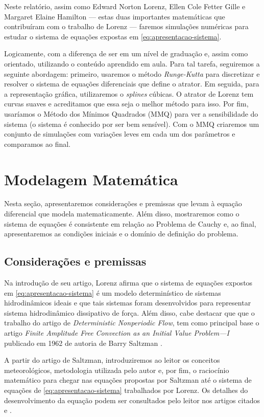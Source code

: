 \documentclass[12pt, a4paper]{article}
\begin{document}
Neste relatório, assim como Edward Norton Lorenz, Ellen Cole Fetter Gille e
Margaret Elaine Hamilton — estas duas importantes matemáticas que contribuíram
com o trabalho de Lorenz — faremos simulações numéricas para estudar o sistema
de equações expostas em \eqref{eq:apresentacao-sistema}.

Logicamente, com a diferença de ser em um nível de graduação e, assim como
orientado, utilizando o conteúdo aprendido em aula. Para tal tarefa, seguiremos
a seguinte abordagem: primeiro, usaremos o método \textit{Runge-Kutta} para
discretizar e resolver o sistema de equações diferenciais que define o atrator.
Em seguida, para a representação gráfica, utilizaremos o \textit{splines}
cúbicas. O atrator de Lorenz tem curvas suaves e acreditamos que essa seja o
melhor método para isso. Por fim, usaríamos o Método dos Mínimos Quadrados
(MMQ) para ver a sensibilidade do sistema (o sistema é conhecido por ser bem
sensível). Com o MMQ criaremos um conjunto de simulações com variações leves em
cada um dos parâmetros e comparamos ao final.

\newpage
\section{Modelagem Matemática}
Nesta seção, apresentaremos considerações e premissas que levam à equação
diferencial que modela matematicamente. Além disso, mostraremos como o sistema
de equações é consistente em relação ao Problema de Cauchy e, ao final,
apresentaremos as condições iniciais e o domínio de definição do problema.

\subsection{Considerações e premissas}

Na introdução de seu artigo, Lorenz afirma que o sistema de equações
expostos em \eqref{eq:apresentacao-sistema} é um modelo determinístico de
sistemas hidrodinâmicos ideais e que tais sistemas foram desenvolvidos para
representar sistema hidrodinâmico dissipativo de força. Além disso, cabe
destacar que que o trabalho do artigo de \textit{Deterministic Nonperiodic
    Flow}\cite{Lorenz1963}, tem como principal base o artigo \textit{Finite
    Amplitude Free Convection as an Initial Value Problem—I} publicado em 1962
de
autoria de Barry Saltzman \cite{Saltzman1962}.

A partir do artigo de Saltzman, introduziremos ao leitor os conceitos
meteorológicos, metodologia utilizada pelo autor e, por fim, o raciocínio
matemático para chegar nas equações propostas por Saltzman até o sistema de
equações de \eqref{eq:apresentacao-sistema} trabalhados por Lorenz. Os detalhes
do desenvolvimento da equação podem ser consultados pelo leitor nos artigos
citados \cite{Lorenz1963} e \cite{Saltzman1962}.
\end{document}
